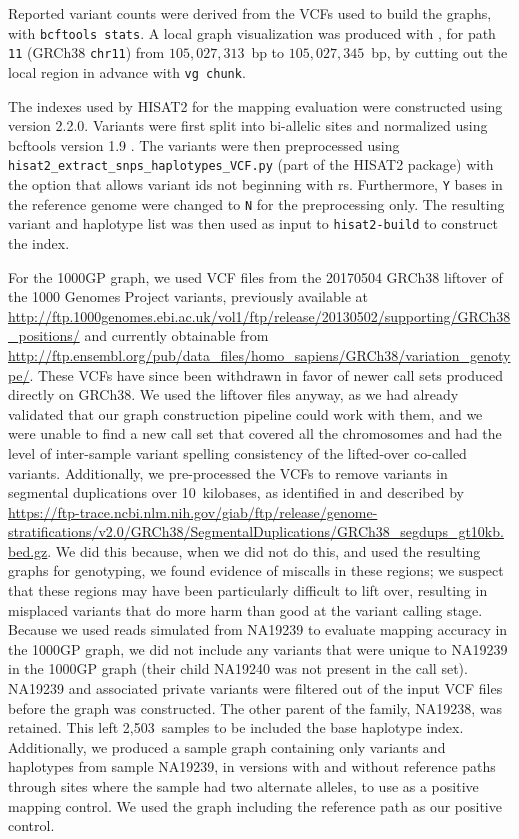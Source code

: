 \documentclass[11pt]{ucscthesis}
\begin{document}
Reported variant counts were derived from the VCFs used to build the graphs, with \texttt{bcftools stats}.
A local graph visualization was produced with \cite{beyer2019sequence}, for path \texttt{11} (GRCh38 \texttt{chr11}) from $105,027,313$~bp to $105,027,345$~bp, by cutting out the local region in advance with \texttt{vg chunk}.

The indexes used by HISAT2 for the mapping evaluation were constructed using version 2.2.0. 
Variants were first split into bi-allelic sites and normalized using bcftools version 1.9 \cite{li_samtools_2011}.
The variants were then preprocessed using\\ \texttt{hisat2\_extract\_snps\_haplotypes\_VCF.py} (part of the HISAT2 package) with the option that allows variant ids not beginning with rs.
Furthermore, \texttt{Y} bases in the reference genome were changed to \texttt{N} for the preprocessing only.
The resulting variant and haplotype list was then used as input to \texttt{hisat2-build} to construct the index.

For the 1000GP graph, we used VCF files from the 20170504 GRCh38 liftover of the 1000 Genomes Project variants, previously available at \url{http://ftp.1000genomes.ebi.ac.uk/vol1/ftp/release/20130502/supporting/GRCh38_positions/} and currently obtainable from \url{http://ftp.ensembl.org/pub/data_files/homo_sapiens/GRCh38/variation_genotype/}.
These VCFs have since been withdrawn in favor of newer call sets produced directly on GRCh38.
We used the liftover files anyway, as we had already validated that our graph construction pipeline could work with them, and we were unable to find a new call set that covered all the chromosomes and had the level of inter-sample variant spelling consistency of the lifted-over co-called variants.
Additionally, we pre-processed the VCFs to remove variants in segmental duplications over 10~kilobases, as identified in \cite{giab_benchmark_2019} and described by \url{https://ftp-trace.ncbi.nlm.nih.gov/giab/ftp/release/genome-stratifications/v2.0/GRCh38/SegmentalDuplications/GRCh38_segdups_gt10kb.bed.gz}.
We did this because, when we did not do this, and used the resulting graphs for genotyping, we found evidence of miscalls in these regions; we suspect that these regions may have been particularly difficult to lift over, resulting in misplaced variants that do more harm than good at the variant calling stage.
Because we used reads simulated from NA19239 to evaluate mapping accuracy in the 1000GP graph, we did not include any variants that were unique to NA19239 in the 1000GP graph (their child NA19240 was not present in the call set).
NA19239 and associated private variants were filtered out of the input VCF files before the graph was constructed.
The other parent of the family, NA19238, was retained.
This left 2,503~samples to be included the base haplotype index.
Additionally, we produced a sample graph containing only variants and haplotypes from sample NA19239, in versions with and without reference paths through sites where the sample had two alternate alleles, to use as a positive mapping control.
We used the graph including the reference path as our positive control.
\end{document}
